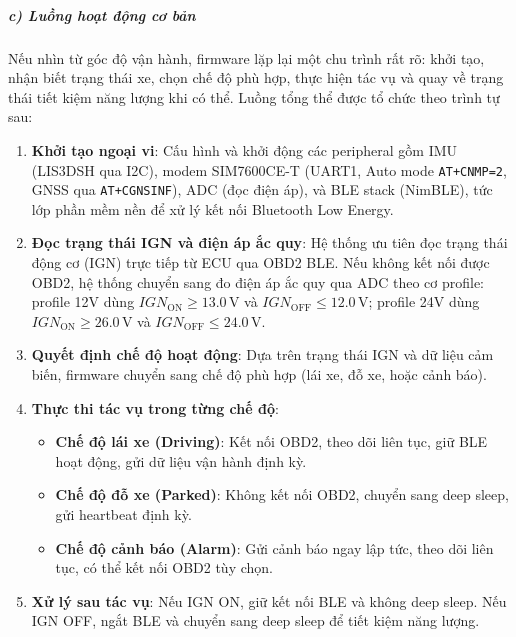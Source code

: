 \documentclass[a4paper]{extarticle}
\providecommand{\tightlist}{%
  \setlength{\itemsep}{0pt}\setlength{\parskip}{0pt}}
\begin{document}
\subparagraph{c) Luồng hoạt động cơ
bản}\label{c-luux1ed3ng-houx1ea1t-ux111ux1ed9ng-cux1a1-bux1ea3n}

Nếu nhìn từ góc độ vận hành, firmware lặp lại một chu trình rất rõ:
khởi tạo, nhận biết trạng thái xe, chọn chế độ phù hợp, thực hiện tác vụ
và quay về trạng thái tiết kiệm năng lượng khi có thể. Luồng tổng thể
được tổ chức theo trình tự sau:

\begin{enumerate}
\def\labelenumi{\arabic{enumi}.}
\item
  \textbf{Khởi tạo ngoại vi}: Cấu hình và khởi động các peripheral gồm
  IMU (LIS3DSH qua I2C), modem SIM7600CE-T (UART1, Auto mode
  \texttt{AT+CNMP=2}, GNSS qua \texttt{AT+CGNSINF}), ADC (đọc điện áp),
  và BLE stack (NimBLE), tức lớp phần mềm nền để xử lý kết nối
  Bluetooth Low Energy.
\item
  \textbf{Đọc trạng thái IGN và điện áp ắc quy}: Hệ thống ưu tiên đọc
  trạng thái động cơ (IGN) trực tiếp từ ECU qua OBD2 BLE. Nếu không kết
  nối được OBD2, hệ thống chuyển sang đo điện áp ắc quy qua ADC theo cơ
  profile: profile 12V dùng \(IGN_{\mathrm{ON}} \ge 13.0\,\mathrm{V}\) và
  \(IGN_{\mathrm{OFF}} \le 12.0\,\mathrm{V}\); profile 24V dùng
  \(IGN_{\mathrm{ON}} \ge 26.0\,\mathrm{V}\) và
  \(IGN_{\mathrm{OFF}} \le 24.0\,\mathrm{V}\).
\item
  \textbf{Quyết định chế độ hoạt động}: Dựa trên trạng thái IGN và dữ
  liệu cảm biến, firmware chuyển sang chế độ phù hợp (lái xe, đỗ xe,
  hoặc cảnh báo).
\item
  \textbf{Thực thi tác vụ trong từng chế độ}:

  \begin{itemize}
  \tightlist
  \item
    \textbf{Chế độ lái xe (Driving)}: Kết nối OBD2, theo dõi liên tục,
    giữ BLE hoạt động, gửi dữ liệu vận hành định kỳ.
  \item
    \textbf{Chế độ đỗ xe (Parked)}: Không kết nối OBD2, chuyển sang deep
    sleep, gửi heartbeat định kỳ.
  \item
    \textbf{Chế độ cảnh báo (Alarm)}: Gửi cảnh báo ngay lập tức, theo
    dõi liên tục, có thể kết nối OBD2 tùy chọn.
  \end{itemize}
\item
  \textbf{Xử lý sau tác vụ}: Nếu IGN ON, giữ kết nối BLE và không deep
  sleep. Nếu IGN OFF, ngắt BLE và chuyển sang deep sleep để tiết kiệm
  năng lượng.
\end{enumerate}
\end{document}

